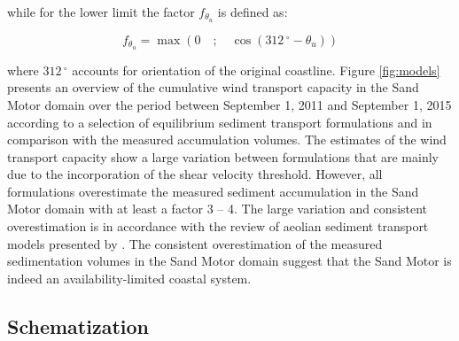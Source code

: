 \documentclass[preprint,12pt,authoryear]{elsarticle}
\begin{document}
\noindent while for the lower limit the factor $f_{\theta_u}$ is defined
as:

\begin{equation}
  f_{\theta_u} = \max \left( 0 \quad ; \quad \cos \left( 312\,^{\circ} - \theta_u \right) \right)
\end{equation}

\noindent where $312\,^{\circ}$ accounts for orientation of the original
coastline.  Figure \ref{fig:models} presents an overview of the
cumulative wind transport capacity in the Sand Motor domain over the
period between September 1, 2011 and September 1, 2015 according to a
selection of equilibrium sediment transport formulations and in
comparison with the measured accumulation volumes. The estimates of
the wind transport capacity show a large variation between
formulations that are mainly due to the incorporation of the shear
velocity threshold. However, all formulations overestimate the
measured sediment accumulation in the Sand Motor domain with at least
a factor 3 -- 4. The large variation and consistent overestimation is
in accordance with the review of aeolian sediment transport models
presented by \citet{Sherman2012}. The consistent overestimation of the
measured sedimentation volumes in the Sand Motor domain suggest that
the Sand Motor is indeed an availability-limited coastal system.

\subsection{Schematization}
\end{document}
